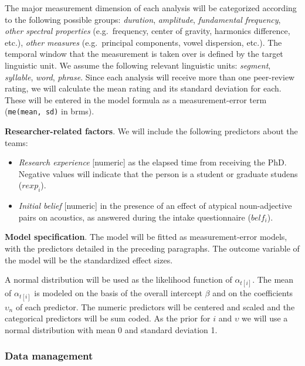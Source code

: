 \documentclass[
  12pt,
]{article}
\providecommand{\tightlist}{%
  \setlength{\itemsep}{0pt}\setlength{\parskip}{0pt}}
\begin{document}
The major measurement dimension of each analysis will be categorized according to the following possible groups: \emph{duration}, \emph{amplitude}, \emph{fundamental frequency}, \emph{other spectral properties} (e.g.~frequency, center of gravity, harmonics difference, etc.), \emph{other measures} (e.g.~principal components, vowel dispersion, etc.).
The temporal window that the measurement is taken over is defined by the target linguistic unit.
We assume the following relevant linguistic units: \emph{segment}, \emph{syllable}, \emph{word}, \emph{phrase}.
Since each analysis will receive more than one peer-review rating, we will calculate the mean rating and its standard deviation for each.
These will be entered in the model formula as a measurement-error term (\texttt{me(mean,\ sd)} in brms).

\textbf{Researcher-related factors}. We will include the following predictors about the teams:

\begin{itemize}
\tightlist
\item
  \emph{Research experience} {[}numeric{]} as the elapsed time from receiving the PhD. Negative values will indicate that the person is a student or graduate studens (\(rexp_i\)).
\item
  \emph{Initial belief} {[}numeric{]} in the presence of an effect of atypical noun-adjective pairs on acoustics, as answered during the intake questionnaire (\(belf_i\)).
\end{itemize}

\textbf{Model specification}. The model will be fitted as measurement-error models, with the predictors detailed in the preceding paragraphs.
The outcome variable of the model will be the standardized effect sizes.

A normal distribution will be used as the likelihood function of \(\alpha_{t[i]}\).
The mean of \(\alpha_{t[i]}\) is modeled on the basis of the overall intercept \(\beta\) and on the coefficients \(\upsilon_n\) of each predictor.
The numeric predictors will be centered and scaled and the categorical predictors will be sum coded.
As the prior for \(i\) and \(\upsilon\) we will use a normal distribution with mean 0 and standard deviation 1.

\hypertarget{ana-archive}{%
\subsubsection{Data management}\label{ana-archive}}
\end{document}
